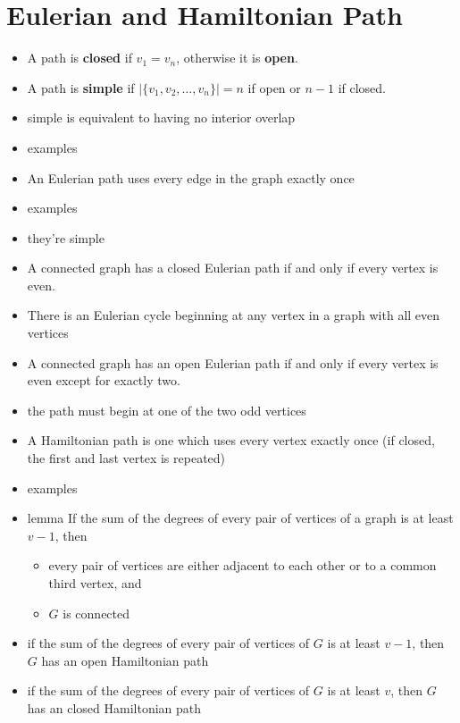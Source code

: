 \section{Eulerian and Hamiltonian Path}\label{sec:euler}


\begin{itemize}
    \item A path is \textbf{closed} if $v_1 = v_n$, otherwise it is \textbf{open}.
    \item A path is \textbf{simple} if $|\{v_1, v_2, \ldots, v_n\}| = n$ if open or $n-1$ if closed. %
    \item simple is equivalent to having no interior overlap
    \item examples
    \item An Eulerian path uses every edge in the graph exactly once
    \item examples
    \item they're simple
    \item A connected graph has a closed Eulerian path if and only if every vertex is even.
    \item There is an Eulerian cycle beginning at any vertex in a graph with all even vertices
    \item A connected graph has an open Eulerian path if and only if every vertex is even except for exactly two.
    \item the path must begin at one of the two odd vertices
    \item A Hamiltonian path is one which uses every vertex exactly once (if closed, the first and last vertex is repeated)
    \item examples
    \item lemma If the sum of the degrees of every pair of vertices of a graph is at least $v-1$, then
    \begin{itemize}
        \item every pair of vertices are either adjacent to each other or to a common third vertex, and
        \item $G$ is connected
    \end{itemize}
    \item if the sum of the degrees of every pair of vertices of $G$ is at least $v-1$, then $G$ has an open Hamiltonian path
    \item if the sum of the degrees of every pair of vertices of $G$ is at least $v$, then $G$ has an closed Hamiltonian path

\end{itemize}
